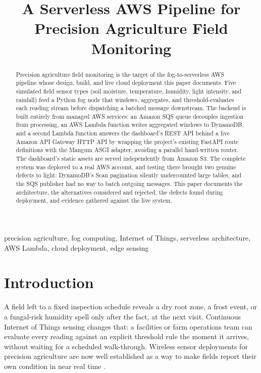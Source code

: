 \documentclass[conference]{IEEEtran}
\begin{document}
\title{A Serverless AWS Pipeline for Precision Agriculture Field Monitoring}

\author{
}

\maketitle

\begin{abstract}
Precision agriculture field monitoring is the target of the fog-to-serverless AWS pipeline whose design, build, and live cloud deployment this paper documents. Five simulated field sensor types (soil moisture, temperature, humidity, light intensity, and rainfall) feed a Python fog node that windows, aggregates, and threshold-evaluates each reading stream before dispatching a batched message downstream. The backend is built entirely from managed AWS services: an Amazon SQS queue decouples ingestion from processing, an AWS Lambda function writes aggregated windows to DynamoDB, and a second Lambda function answers the dashboard's REST API behind a live Amazon API Gateway HTTP API by wrapping the project's existing FastAPI route definitions with the Mangum ASGI adapter, avoiding a parallel hand-written router. The dashboard's static assets are served independently from Amazon S3. The complete system was deployed to a real AWS account, and testing there brought two genuine defects to light: DynamoDB's Scan pagination silently undercounted large tables, and the SQS publisher had no way to batch outgoing messages. This paper documents the architecture, the alternatives considered and rejected, the defects found during deployment, and evidence gathered against the live system.
\end{abstract}

\begin{IEEEkeywords}
precision agriculture, fog computing, Internet of Things, serverless architecture, AWS Lambda, cloud deployment, edge sensing
\end{IEEEkeywords}

\section{Introduction}
A field left to a fixed inspection schedule reveals a dry root zone, a frost event, or a fungal-risk humidity spell only after the fact, at the next visit. Continuous Internet of Things sensing changes that: a facilities or farm operations team can evaluate every reading against an explicit threshold rule the moment it arrives, without waiting for a scheduled walk-through. Wireless sensor deployments for precision agriculture are now well established as a way to make fields report their own condition in near real time \cite{ref1}.
\end{document}
